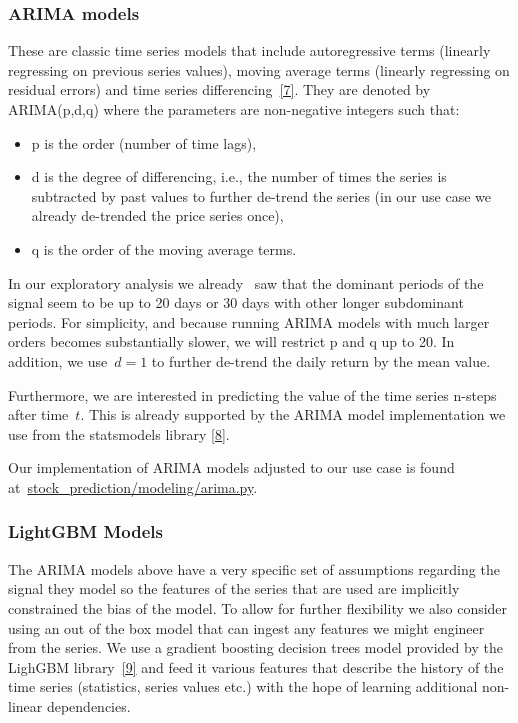 \documentclass[10pt]{article}
\providecommand{\tightlist}{\setlength{\itemsep}{0pt}\setlength{\parskip}{0pt}}%
\begin{document}
\subsubsection{ARIMA models}

{\label{677332}}

These are classic time series models that include autoregressive terms
(linearly regressing on previous series values), moving average terms
(linearly regressing on residual errors) and time series
differencing~\hyperref[csl:7]{[7]}. They are denoted by ARIMA(p,d,q) where
the parameters are non-negative integers such that:

\begin{itemize}
\tightlist
\item
  p is the order (number of time lags),
\item
  d is the degree of differencing, i.e., the number of times the series
  is subtracted by past values to further de-trend the series (in our
  use case we already de-trended the price series once),
\item
  q is the order of the moving average terms.
\end{itemize}

In our exploratory analysis we already~ saw that the dominant periods of
the signal seem to be up to 20 days or 30 days with other longer
subdominant periods. For simplicity, and because running ARIMA models
with much larger orders becomes substantially slower, we will restrict p
and q up to 20. In addition, we use~\(d=1\) to further
de-trend the daily return by the mean value.

Furthermore, we are interested in predicting the value of the time
series n-steps after time~\(t\). This is already supported
by the ARIMA model implementation we use from the statsmodels library
\hyperref[csl:8]{[8]}.

Our implementation of ARIMA models adjusted to our use case is found
at~\href{https://github.com/marcoopsampaio/aws_ml_eng_project_stock_prediction/blob/main/stock_prediction/modeling/arima.py}{stock\_prediction/modeling/arima.py}.

\subsubsection{LightGBM Models}

{\label{690918}}

The ARIMA models above have a very specific set of assumptions regarding
the signal they model so the features of the series that are used are
implicitly constrained the bias of the model. To allow for further
flexibility we also consider using an out of the box model that can
ingest any features we might engineer from the series. We use a gradient
boosting decision trees model provided by the LighGBM
library~\hyperref[csl:9]{[9]} and feed it various features that describe
the history of the time series (statistics, series values etc.) with the
hope of learning additional non-linear dependencies.~
\end{document}

